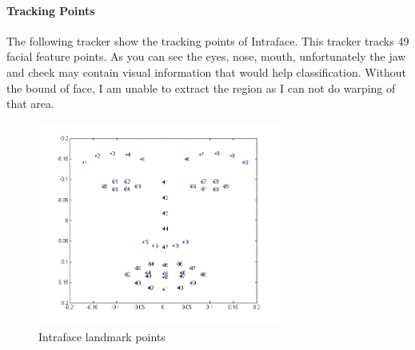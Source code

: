 \paragraph{Tracking Points}
The following tracker show the tracking points of Intraface. This tracker tracks 49 facial feature points. As you can see the eyes, nose, mouth, unfortunately the jaw and cheek may contain visual information that would help classification. Without the bound of face, I am unable to extract the region  as I can not do warping of that area.
\begin{figure}[ht]
\centering
\includegraphics[width = 80mm]{imgs/FacialIndexIntraface.png}
\caption{Intraface landmark points}
\label{fig:IPI}
\end{figure}
